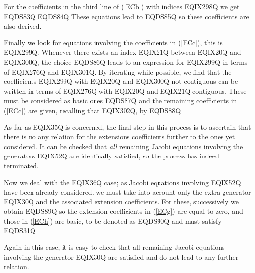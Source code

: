 For the coefficients in the third line of (\ref{ECb}) with indices
EQIX298Q we get
EQDS83Q
EQDS84Q
These equations lead to
EQDS85Q
so these coefficients are also derived.

Finally we look for equations involving the coefficients in
(\ref{ECc}), this is EQIX299Q. Whenever there exists an index
EQIX21Q between EQIX20Q and EQIX300Q, the choice
EQDS86Q
leads to an expression for EQIX299Q in terms of EQIX276Q and
EQIX301Q. By iterating while possible, we find that the
coefficients   EQIX299Q with EQIX20Q and EQIX300Q not contiguous can be
written in terms of EQIX276Q with EQIX20Q and EQIX21Q contiguous. These
must be considered as basic ones
EQDS87Q
and the remaining coefficients in (\ref{ECc}) are given, recalling that
EQIX302Q, by
EQDS88Q

As far as EQIX35Q is concerned, the final step in this
process is to ascertain that there is no  any relation for the
extensions coefficients further to the ones yet considered. It can
be checked that \emph{all} remaining Jacobi equations
involving the generators EQIX52Q are
identically satisfied, so the process has indeed terminated.

Now we deal with the EQIX36Q case; as Jacobi equations
involving EQIX52Q have been already considered,
we must take into account only the extra generator EQIX30Q and the
associated extension coefficients. For these, successively we obtain
EQDS89Q
so the extension coefficients in (\ref{ECg}) are equal to zero,  and those in
(\ref{ECh}) are basic, to be denoted as
EQDS90Q
and must satisfy
EQDS31Q

Again in this case, it is easy to check that all  remaining Jacobi
equations involving the generator EQIX30Q are satisfied and  do not lead
to any further relation.

